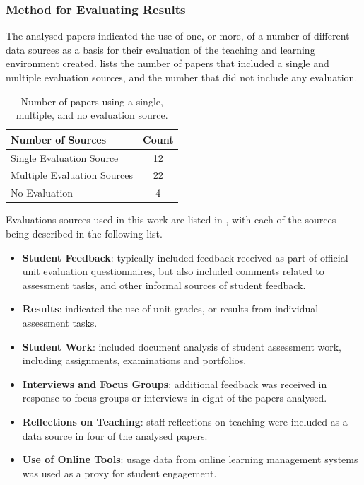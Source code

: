 
\clearpage

\subsubsection{Method for Evaluating Results} %
\label{sub:method_for_evaluating_results}

The analysed papers indicated the use of one, or more, of a number of different data sources as a basis for their evaluation of the teaching and learning environment created.  lists the number of papers that included a single and multiple evaluation sources, and the number that did not include any evaluation.

\begin{table}[h]
	\centering
	\caption{Number of papers using a single, multiple, and no evaluation source.}
	\label{tbl:eval_source}
	\footnotesize
    \begin{tabular}{l|c}
     \textbf{Number of Sources} & \textbf{Count} \\ \hline
	Single Evaluation Source	 & 12 \\
	Multiple Evaluation Sources	 & 22 \\
	No Evaluation & 	4 \\
    \end{tabular}
\end{table}

Evaluations sources used in this work are listed in , with each of the sources being described in the following list. 

\begin{itemize}[noitemsep,nolistsep]
	\item \textbf{Student Feedback}: typically included feedback received as part of official unit evaluation questionnaires, but also included comments related to assessment tasks, and other informal sources of student feedback.
	\item \textbf{Results}: indicated the use of unit grades, or results from individual assessment tasks.
	\item \textbf{Student Work}: included document analysis of student assessment work, including assignments, examinations and portfolios.
	\item \textbf{Interviews and Focus Groups}: additional feedback was received in response to focus groups or interviews in eight of the papers analysed.
	\item \textbf{Reflections on Teaching}: staff reflections on teaching were included as a data source in four of the analysed papers.
	\item \textbf{Use of Online Tools}: usage data from online learning management systems was used as a proxy for student engagement.
\end{itemize}


